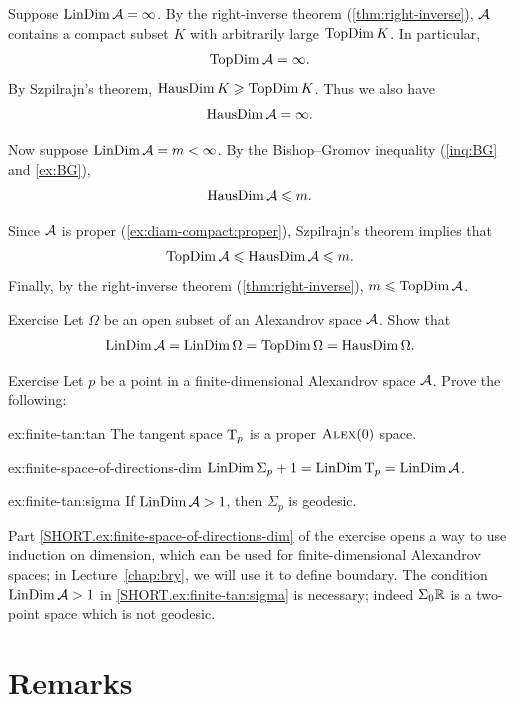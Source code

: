 Suppose $\mathop{\rm LinDim}\nolimits \mathcal{A}=\infty$.
By the right-inverse theorem (\ref{thm:right-inverse}), $\mathcal{A}$ contains a compact subset $K$ with arbitrarily large $\mathop{\rm TopDim}\nolimits K$.
In particular,
\[\mathop{\rm TopDim}\nolimits\mathcal{A}=\infty.\]
By Szpilrajn's theorem,
$\mathop{\rm HausDim}\nolimits K\geqslant \mathop{\rm TopDim}\nolimits K$.
Thus we also have
\[\mathop{\rm HausDim}\nolimits\mathcal{A}=\infty.\]

Now suppose $\mathop{\rm LinDim}\nolimits \mathcal{A}=m<\infty$.
By the Bishop--Gromov inequality (\ref{inq:BG} and \ref{ex:BG}),
\[\mathop{\rm HausDim}\nolimits\mathcal{A}\leqslant m.\]

Since $\mathcal{A}$ is proper (\ref{ex:diam-compact:proper}),
Szpilrajn's theorem implies that
\[\mathop{\rm TopDim}\nolimits\mathcal{A}\leqslant \mathop{\rm HausDim}\nolimits\mathcal{A}\leqslant m.\]
Finally, by the right-inverse theorem (\ref{thm:right-inverse}), $m\leqslant\mathop{\rm TopDim}\nolimits\mathcal{A}$.
\qeds

\begin{thm}{Exercise}\label{ex:dim=dim}
Let $\Omega$ be an open subset of an Alexandrov space $\mathcal{A}$.
Show that
\[\mathop{\rm LinDim}\nolimits \mathcal{A}=\mathop{\rm LinDim}\nolimits \Omega=\mathop{\rm TopDim}\nolimits \Omega=\mathop{\rm HausDim}\nolimits \Omega.\]
\end{thm}

\begin{thm}[!]{Exercise}\label{ex:finite-tan}
Let $p$ be a point in a finite-dimensional Alexandrov space $\mathcal{A}$.
Prove the following:
\begin{subthm}{ex:finite-tan:tan}
The tangent space $\mathrm{T}_p$ is a proper $\textup{\textsc{Alex}}(0)$ space.
\end{subthm}

\begin{subthm}{ex:finite-space-of-directions-dim}
$\mathop{\rm LinDim}\nolimits\Sigma_p+1=\mathop{\rm LinDim}\nolimits\mathrm{T}_p=\mathop{\rm LinDim}\nolimits\mathcal{A}$.
\end{subthm}

\begin{subthm}{ex:finite-tan:sigma}
If $\mathop{\rm LinDim}\nolimits \mathcal{A}>1$, then $\Sigma_p$ is geodesic.
\end{subthm}

\end{thm}

Part \ref{SHORT.ex:finite-space-of-directions-dim} of the exercise opens a way to use induction on dimension, which can be used for finite-dimensional Alexandrov spaces;
in Lecture~\ref{chap:bry}, we will use it to define boundary.
The condition $\mathop{\rm LinDim}\nolimits \mathcal{A}>1$ in \ref{SHORT.ex:finite-tan:sigma} is necessary;
indeed $\Sigma_0\mathbb{R}$ is a two-point space which is not geodesic.

\section{Remarks}

